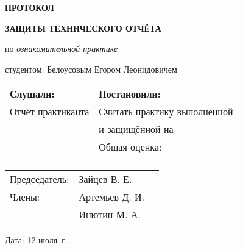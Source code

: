 \begin{center}
\bfseries{\large ПРОТОКОЛ }

\vspace{12pt}

\bfseries{ЗАЩИТЫ ТЕХНИЧЕСКОГО ОТЧЁТА}
\end{center}
\noindent
по {\itshape ознакомительной практике}

\vspace{8pt}
\noindent
студентом:
\noindent
Белоусовым Егором Леонидовичем

\begin{longtable}{p{7cm}|p{11cm}}
    \hline
    {\bfseries Слушали:} & {\bfseries Постановили:}  \\
    Отчёт практиканта & Считать практику выполненной \\
    & и защищённой на \\
    \rule{0pt}{450pt} & Общая оценка: \underline{\hspace{2in}}\\
    \rule{0pt}{15pt} & \\
    \hline
\end{longtable}

\vfill

\noindent\begin{tabular}{@{}l l l}
Председатель: & Зайцев В. Е. & \underline{\hspace{2in}} \\
Члены: & Артемьев Д. И. & \underline{\hspace{2in}} \\
& Инютин М. А. & \underline{\hspace{2in}}
\end{tabular}
\vspace{12pt}

\noindent
Дата: 12 июля \the\year\,г.\hspace{50pt}

\pagebreak
